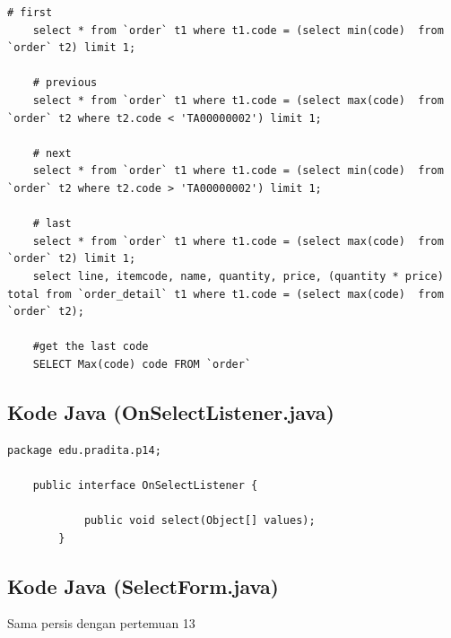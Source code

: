 \begin{lstlisting}[style=JavaStyle]
	# first
	select * from `order` t1 where t1.code = (select min(code)  from `order` t2) limit 1;
	
	# previous
	select * from `order` t1 where t1.code = (select max(code)  from `order` t2 where t2.code < 'TA00000002') limit 1;
	
	# next
	select * from `order` t1 where t1.code = (select min(code)  from `order` t2 where t2.code > 'TA00000002') limit 1;
	
	# last
	select * from `order` t1 where t1.code = (select max(code)  from `order` t2) limit 1;
	select line, itemcode, name, quantity, price, (quantity * price) total from `order_detail` t1 where t1.code = (select max(code)  from `order` t2);
	
	#get the last code
	SELECT Max(code) code FROM `order`
\end{lstlisting}


\subsection{Kode Java (OnSelectListener.java)}

\begin{lstlisting}[style=JavaStyle]
	package edu.pradita.p14;
	
	public interface OnSelectListener {
			
			public void select(Object[] values);
		}
\end{lstlisting}

\subsection{Kode Java (SelectForm.java)}

Sama persis dengan pertemuan 13

